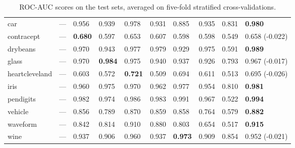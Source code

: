 \begin{table}[ht]
\begin{tabular}{l|llllllll|l}
  car & --- & 0.956 & 0.939 & 0.978 & 0.931 & 0.885 & 0.935 & 0.831 & \textbf{0.980} \\ 
  contracept & --- & \textbf{0.680} & 0.597 & 0.653 & 0.607 & 0.598 & 0.598 & 0.549 & 0.658 \tiny{(-0.022)} \\ 
  drybeans & --- & 0.970 & 0.943 & 0.977 & 0.979 & 0.929 & 0.975 & 0.591 & \textbf{0.989} \\ 
  glass & --- & 0.970 & \textbf{0.984} & 0.975 & 0.940 & 0.937 & 0.926 & 0.793 & 0.967 \tiny{(-0.017)} \\ 
  heartcleveland & --- & 0.603 & 0.572 & \textbf{0.721} & 0.509 & 0.694 & 0.611 & 0.513 & 0.695 \tiny{(-0.026)} \\ 
  iris & --- & 0.960 & 0.975 & 0.970 & 0.962 & 0.977 & 0.954 & 0.810 & \textbf{0.981} \\ 
  pendigits & --- & 0.982 & 0.974 & 0.986 & 0.983 & 0.991 & 0.967 & 0.522 & \textbf{0.994} \\ 
  vehicle & --- & 0.856 & 0.789 & 0.870 & 0.859 & 0.858 & 0.764 & 0.579 & \textbf{0.882} \\ 
  waveform & --- & 0.842 & 0.814 & 0.910 & 0.880 & 0.803 & 0.654 & 0.517 & \textbf{0.915} \\ 
  wine & --- & 0.937 & 0.906 & 0.960 & 0.937 & \textbf{0.973} & 0.909 & 0.854 & 0.952 \tiny{(-0.021)} \\ 
   \hline
  

\end{tabular}
\caption{ROC-AUC scores on the test sets, averaged on five-fold stratified cross-validations.} \label{table:roc_auc}
\end{table}